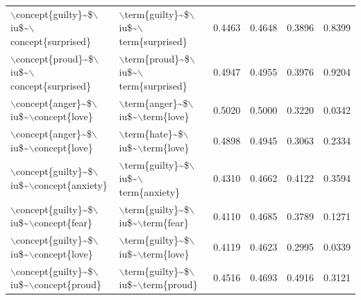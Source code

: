 \begin{table}[ht]
\begin{tabular}{llrrrr}
  $\backslash$concept\{guilty\}\~{}\$$\backslash$iu\$\~{}$\backslash$concept\{surprised\} & $\backslash$term\{guilty\}\~{}\$$\backslash$iu\$\~{}$\backslash$term\{surprised\} & 0.4463 & 0.4648 & 0.3896 & 0.8399 \\ 
  $\backslash$concept\{proud\}\~{}\$$\backslash$iu\$\~{}$\backslash$concept\{surprised\} & $\backslash$term\{proud\}\~{}\$$\backslash$iu\$\~{}$\backslash$term\{surprised\} & 0.4947 & 0.4955 & 0.3976 & 0.9204 \\ 
  $\backslash$concept\{anger\}\~{}\$$\backslash$iu\$\~{}$\backslash$concept\{love\} & $\backslash$term\{anger\}\~{}\$$\backslash$iu\$\~{}$\backslash$term\{love\} & 0.5020 & 0.5000 & 0.3220 & 0.0342 \\ 
  $\backslash$concept\{anger\}\~{}\$$\backslash$iu\$\~{}$\backslash$concept\{love\} & $\backslash$term\{hate\}\~{}\$$\backslash$iu\$\~{}$\backslash$term\{love\} & 0.4898 & 0.4945 & 0.3063 & 0.2334 \\ 
  $\backslash$concept\{guilty\}\~{}\$$\backslash$iu\$\~{}$\backslash$concept\{anxiety\} & $\backslash$term\{guilty\}\~{}\$$\backslash$iu\$\~{}$\backslash$term\{anxiety\} & 0.4310 & 0.4662 & 0.4122 & 0.3594 \\ 
  $\backslash$concept\{guilty\}\~{}\$$\backslash$iu\$\~{}$\backslash$concept\{fear\} & $\backslash$term\{guilty\}\~{}\$$\backslash$iu\$\~{}$\backslash$term\{fear\} & 0.4110 & 0.4685 & 0.3789 & 0.1271 \\ 
  $\backslash$concept\{guilty\}\~{}\$$\backslash$iu\$\~{}$\backslash$concept\{love\} & $\backslash$term\{guilty\}\~{}\$$\backslash$iu\$\~{}$\backslash$term\{love\} & 0.4119 & 0.4623 & 0.2995 & 0.0339 \\ 
  $\backslash$concept\{guilty\}\~{}\$$\backslash$iu\$\~{}$\backslash$concept\{proud\} & $\backslash$term\{guilty\}\~{}\$$\backslash$iu\$\~{}$\backslash$term\{proud\} & 0.4516 & 0.4693 & 0.4916 & 0.3121 \\ 
   \hline
\end{tabular}
\end{table}

